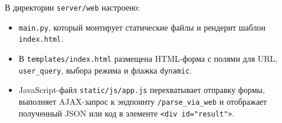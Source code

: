 В директории \texttt{server/web} настроено:
\begin{itemize}
    \item \texttt{main.py}, который монтирует статические файлы и рендерит шаблон \texttt{index.html}.
    \item В \texttt{templates/index.html} размещена HTML-форма с полями для URL, \texttt{user\_query}, выбора режима и флажка \texttt{dynamic}.
    \item JavaScript-файл \texttt{static/js/app.js} перехватывает отправку формы, выполняет AJAX-запрос к эндпоинту \texttt{/parse\_via\_web} и отображает полученный JSON или код в элементе \texttt{<div id="result">}.
\end{itemize}

